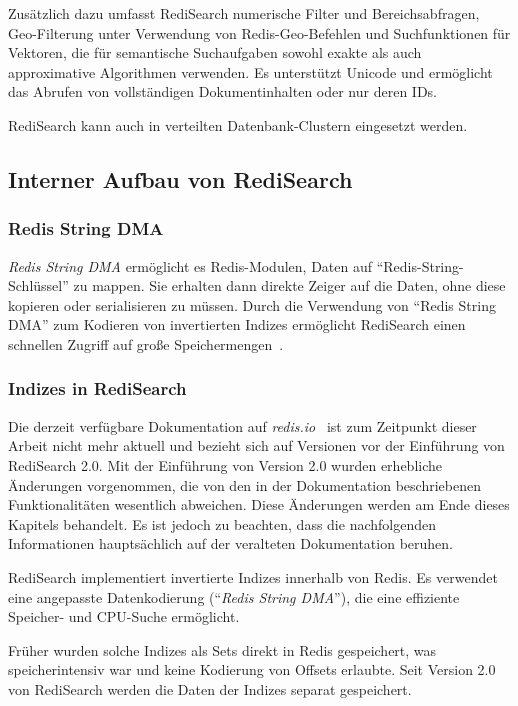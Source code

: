 Zusätzlich dazu umfasst RediSearch numerische Filter und Bereichsabfragen, Geo-Filterung unter Verwendung von Redis-Geo-Befehlen und Suchfunktionen für Vektoren, die für semantische Suchaufgaben sowohl exakte als auch approximative Algorithmen verwenden.
Es unterstützt Unicode und ermöglicht das Abrufen von vollständigen Dokumentinhalten oder nur deren IDs.

RediSearch kann auch in verteilten Datenbank-Clustern eingesetzt werden.
\subsection{Interner Aufbau von RediSearch}
\subsubsection{Redis String DMA} %
\emph{Redis String DMA} ermöglicht es Redis-Modulen, Daten auf \enquote{Redis-String-Schlüssel} zu mappen. Sie erhalten dann direkte Zeiger auf die Daten, ohne diese kopieren oder serialisieren zu müssen.
Durch die Verwendung von \enquote{Redis String DMA} zum Kodieren von invertierten Indizes ermöglicht RediSearch einen schnellen Zugriff auf große Speichermengen~\cite{redis_ltd_internal_nodate}.


\subsubsection{Indizes in RediSearch}
Die derzeit verfügbare Dokumentation auf \emph{redis.io}~\cite{redis_ltd_internal_nodate} ist zum Zeitpunkt dieser Arbeit nicht mehr aktuell und bezieht sich auf Versionen vor der Einführung von RediSearch 2.0.
Mit der Einführung von Version 2.0 wurden erhebliche Änderungen vorgenommen, die von den in der Dokumentation beschriebenen Funktionalitäten wesentlich abweichen.
Diese Änderungen werden am Ende dieses Kapitels behandelt.
Es ist jedoch zu beachten, dass die nachfolgenden Informationen hauptsächlich auf der veralteten Dokumentation beruhen.

RediSearch implementiert invertierte Indizes innerhalb von Redis.
Es verwendet eine angepasste Datenkodierung (\enquote{\emph{Redis String DMA}}), die eine effiziente Speicher- und CPU-Suche ermöglicht.

Früher wurden solche Indizes als Sets direkt in Redis gespeichert, was speicherintensiv war und keine Kodierung von Offsets erlaubte. Seit Version 2.0 von RediSearch werden die Daten der Indizes separat gespeichert.

